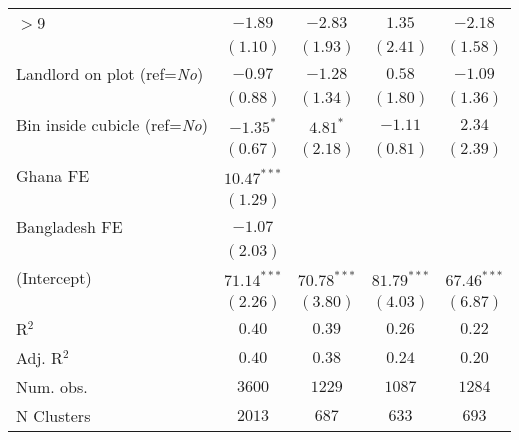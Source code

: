 \begin{center}
\begin{scriptsize}
\begin{ThreePartTable}
\begin{longtable}{l@{} c@{} c@{} c@{} c@{}}
\quad $>$9                                                 & $-1.89$        & $-2.83$        & $1.35$        & $-2.18$       \\
                                                           & $(1.10)$       & $(1.93)$       & $(2.41)$      & $(1.58)$      \\
Landlord on plot (ref=\textit{No})                         & $-0.97$        & $-1.28$        & $0.58$        & $-1.09$       \\
                                                           & $(0.88)$       & $(1.34)$       & $(1.80)$      & $(1.36)$      \\
Bin inside cubicle (ref=\textit{No})                       & $-1.35^{*}$    & $4.81^{*}$     & $-1.11$       & $2.34$        \\
                                                           & $(0.67)$       & $(2.18)$       & $(0.81)$      & $(2.39)$      \\
Ghana FE                                                   & $10.47^{***}$  &                &               &               \\
                                                           & $(1.29)$       &                &               &               \\
Bangladesh FE                                              & $-1.07$        &                &               &               \\
                                                           & $(2.03)$       &                &               &               \\
(Intercept)                                                & $71.14^{***}$  & $70.78^{***}$  & $81.79^{***}$ & $67.46^{***}$ \\
                                                           & $(2.26)$       & $(3.80)$       & $(4.03)$      & $(6.87)$      \\
\midrule
R$^2$                                                      & $0.40$         & $0.39$         & $0.26$        & $0.22$        \\
Adj. R$^2$                                                 & $0.40$         & $0.38$         & $0.24$        & $0.20$        \\
Num. obs.                                                  & $3600$         & $1229$         & $1087$        & $1284$        \\
N Clusters                                                 & $2013$         & $687$          & $633$         & $693$         \\
\end{longtable}
\end{ThreePartTable}
\end{scriptsize}
\end{center}
